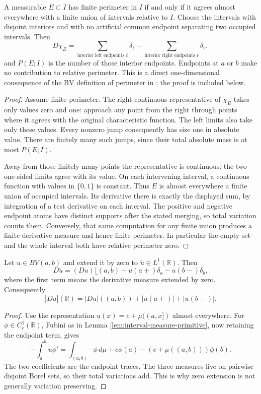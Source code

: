 \begin{theorem}\label{thm:interval-finite-perimeter-sets}
A measurable $E\subset I$ has finite perimeter in $I$ if and only if it agrees almost everywhere with a finite union of intervals relative to $I$. Choose the intervals with disjoint interiors and with no artificial common endpoint separating two occupied intervals. Then
\[
 D\chi_E=\sum_{\text{interior left endpoints }\ell}\delta_\ell
 -\sum_{\text{interior right endpoints }r}\delta_r,
\]
and $P(E;I)$ is the number of those interior endpoints. Endpoints at $a$ or $b$ make no contribution to relative perimeter.
This is a direct one-dimensional consequence of the BV definition of perimeter in \cite{Sim18}; the proof is included below.
\end{theorem}
\begin{proof}
Assume finite perimeter. The right-continuous representative of $\chi_E$ takes only values zero and one: approach any point from the right through points where it agrees with the original characteristic function. The left limits also take only these values. Every nonzero jump consequently has size one in absolute value. There are finitely many such jumps, since their total absolute mass is at most $P(E;I)$.

Away from those finitely many points the representative is continuous: the two one-sided limits agree with its value. On each intervening interval, a continuous function with values in $\{0,1\}$ is constant. Thus $E$ is almost everywhere a finite union of occupied intervals. Its derivative there is exactly the displayed sum, by integration of a test derivative on each interval. The positive and negative endpoint atoms have distinct supports after the stated merging, so total variation counts them. Conversely, that same computation for any finite union produces a finite derivative measure and hence finite perimeter. In particular the empty set and the whole interval both have relative perimeter zero.
\end{proof}

\begin{proposition}\label{prop:interval-bv-zero-extension}
Let $u\in BV(a,b)$ and extend it by zero to $\widetilde u\in L^1(\mathbb R)$. Then
\[
 D\widetilde u=(Du)\lfloor(a,b)+u(a+)\delta_a-u(b-)\delta_b,
\]
where the first term means the derivative measure extended by zero. Consequently
\[
 |D\widetilde u|(\mathbb R)=|Du|((a,b))+|u(a+)|+|u(b-)|.
\]
\end{proposition}
\begin{proof}
Use the representation $u(x)=c+\mu((a,x])$ almost everywhere. For $\phi\in C_c^1(\mathbb R)$, Fubini as in Lemma \ref{lem:interval-measure-primitive}, now retaining the endpoint term, gives
\[
 -\int_a^bu\phi'
 =\int_{(a,b)}\phi\,d\mu+c\phi(a)-(c+\mu((a,b)))\phi(b).
\]
The two coefficients are the endpoint traces. The three measures live on pairwise disjoint Borel sets, so their total variations add. This is why zero extension is not generally variation preserving.
\end{proof}
